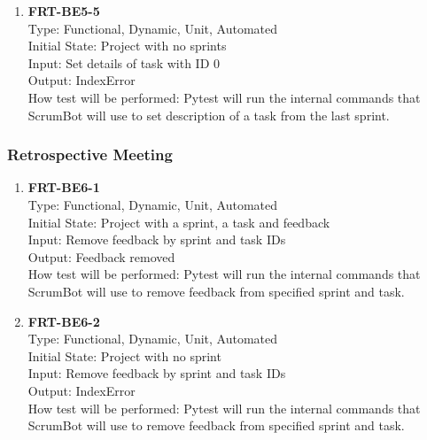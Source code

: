 \documentclass[12pt, titlepage]{article}
\begin{document}
\begin{enumerate}
    \item{\textbf{FRT-BE5-5}}\\
    Type: Functional, Dynamic, Unit, Automated\\
    Initial State: Project with no sprints\\
    Input: Set details of task with ID 0\\
    Output: IndexError\\
    How test will be performed: Pytest will run the internal commands that ScrumBot will use to set description of a task from the last sprint.
\end{enumerate}

\subsubsection{Retrospective Meeting}
\begin{enumerate}
    \item{\textbf{FRT-BE6-1}}\\
    Type: Functional, Dynamic, Unit, Automated\\
    Initial State: Project with a sprint, a task and feedback\\
    Input: Remove feedback by sprint and task IDs\\
    Output: Feedback removed\\
    How test will be performed: Pytest will run the internal commands that ScrumBot will use to remove feedback from specified sprint and task.
    
    \item{\textbf{FRT-BE6-2}}\\
    Type: Functional, Dynamic, Unit, Automated\\
    Initial State: Project with no sprint\\
    Input: Remove feedback by sprint and task IDs\\
    Output: IndexError\\
    How test will be performed: Pytest will run the internal commands that ScrumBot will use to remove feedback from specified sprint and task.
\end{enumerate}
\end{document}
